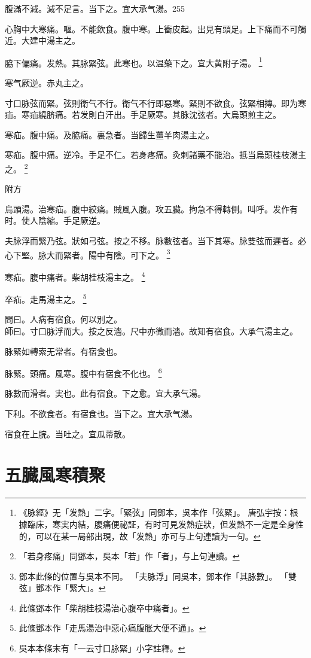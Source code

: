 腹滿不減。減不足言。当下之。宜{\khaai 大}承气湯。255

心胸中大寒痛。嘔。不能飲食。腹中寒。上衝皮起。出見有頭足。上下痛而不可觸近。大建中湯主之。

脇下偏痛。发熱。其脉緊弦。此寒也。以温藥下之。宜大黄附子湯。
	\footnote{
		《脉經》无「发熱」二字。「緊弦」同鄧本，吳本作「弦緊」。
		唐弘宇按：根據臨床，寒実内結，腹痛便祕証，有时可見发熱症狀，但发熱不一定是全身性的，可以在某一局部出現，故「发熱」亦可与上句連讀为一句。
	}

寒气厥逆。赤丸主之。

寸口脉弦而緊。弦則衛气不行。衛气不行即惡寒。緊則不欲食。弦緊相摶。即为寒疝。寒疝繞脐痛。若发則白汗出。手足厥寒。其脉沈弦者。大烏頭煎主之。

寒疝。腹中痛。及脇痛。裏急者。当歸生薑羊肉湯主之。

寒疝。腹中痛。逆冷。手足不仁。若身疼痛。灸刺諸藥不能治。抵当烏頭桂枝湯主之。
	\footnote{
		「若身疼痛」同鄧本，吳本「若」作「者」，与上句連讀。
	}

附方

烏頭湯。治寒疝。腹中絞痛。賊風入腹。攻五臟。拘急不得轉側。叫呼。发作有时。使人陰縮。手足厥逆。

夫脉浮而緊乃弦。狀如弓弦。按之不移。脉數弦者。当下其寒。脉雙弦而遲者。必心下堅。脉大而緊者。陽中有陰。可下之。
	\footnote{
		鄧本此條的位置与吳本不同。
		「夫脉浮」同吳本，鄧本作「其脉數」。
		「雙弦」鄧本作「緊大」。
	}

寒疝。腹中痛者。柴胡桂枝湯主之。
	\footnote{
		此條鄧本作「柴胡桂枝湯治心腹卒中痛者」。
	}

卒疝。走馬湯主之。
	\footnote{
		此條鄧本作「走馬湯治中惡心痛腹胀大便不通」。
	}

問曰。人病有宿食。何以別之。\\
師曰。寸口脉浮而大。按之反濇。尺中亦微而濇。故知有宿食。大承气湯主之。

脉緊如轉索无常者。有宿食也。

脉緊。頭痛。風寒。腹中有宿食不化也。
	\footnote{
		吳本本條末有「一云寸口脉緊」小字註釋。
	}

脉數而滑者。実也。此有宿食。下之愈。宜大承气湯。

下利。不欲食者。有宿食也。当下之。宜大承气湯。

宿食在上脘。当吐之。宜瓜蒂散。

\chapter{五臓風寒積聚}

